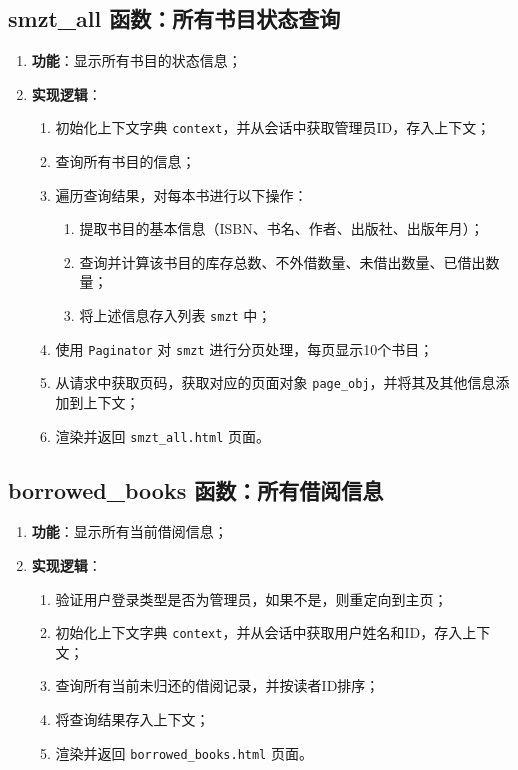 \documentclass{ctexart}
\begin{document}
\subsection{smzt\_all 函数：所有书目状态查询}
\begin{enumerate}
    \item \textbf{功能}：显示所有书目的状态信息；
    \item \textbf{实现逻辑}：
    \begin{enumerate}
        \item 初始化上下文字典 \texttt{context}，并从会话中获取管理员ID，存入上下文；
        \item 查询所有书目的信息；
        \item 遍历查询结果，对每本书进行以下操作：
        \begin{enumerate}
            \item 提取书目的基本信息（ISBN、书名、作者、出版社、出版年月）；
            \item 查询并计算该书目的库存总数、不外借数量、未借出数量、已借出数量；
            \item 将上述信息存入列表 \texttt{smzt} 中；
        \end{enumerate}
        \item 使用 \texttt{Paginator} 对 \texttt{smzt} 进行分页处理，每页显示10个书目；
        \item 从请求中获取页码，获取对应的页面对象 \texttt{page\_obj}，并将其及其他信息添加到上下文；
        \item 渲染并返回 \texttt{smzt\_all.html} 页面。
    \end{enumerate}
\end{enumerate}

\subsection{borrowed\_books 函数：所有借阅信息}
\begin{enumerate}
    \item \textbf{功能}：显示所有当前借阅信息；
    \item \textbf{实现逻辑}：
    \begin{enumerate}
        \item 验证用户登录类型是否为管理员，如果不是，则重定向到主页；
        \item 初始化上下文字典 \texttt{context}，并从会话中获取用户姓名和ID，存入上下文；
        \item 查询所有当前未归还的借阅记录，并按读者ID排序；
        \item 将查询结果存入上下文；
        \item 渲染并返回 \texttt{borrowed\_books.html} 页面。
    \end{enumerate}
\end{enumerate}
\end{document}
